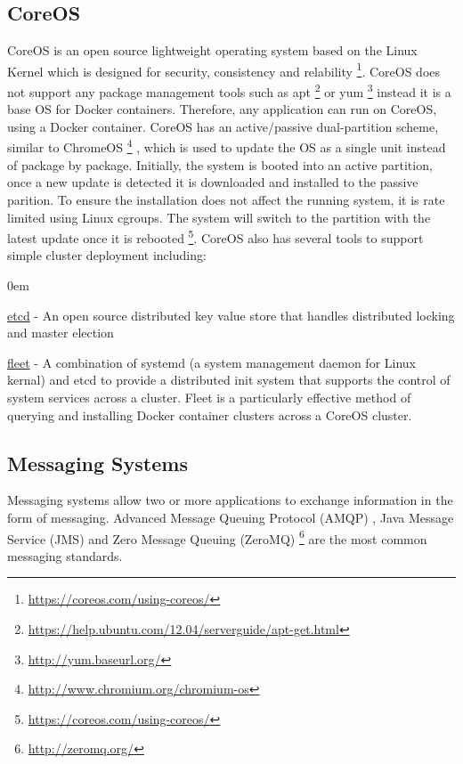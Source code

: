 \documentclass[a4paper,11pt,twoside]{article}
\begin{document}
\subsection{CoreOS} \label{CoreOS}
CoreOS is an open source lightweight operating system based on the Linux Kernel which is designed for security, consistency and relability \footnote {\label{coreos} \url {https://coreos.com/using-coreos/}}. CoreOS does not support any package management tools such as apt \footnote{\url{https://help.ubuntu.com/12.04/serverguide/apt-get.html}} or yum \footnote {\url{http://yum.baseurl.org/}} instead it is a base OS for Docker containers. Therefore, any application can run on CoreOS, using a Docker container. CoreOS has an active/passive dual-partition scheme, similar to ChromeOS \footnote{\url{http://www.chromium.org/chromium-os}} , which is used to update the OS as a single unit instead of package by package. Initially, the system is booted into an active partition, once a new update is detected it is downloaded and installed to the passive parition. To ensure the installation does not affect the running system, it is rate limited using Linux cgroups. The system will switch to the partition with the latest update once it is rebooted \footnote {\label{coreos} \url {https://coreos.com/using-coreos/}}. CoreOS also has several tools to support simple cluster deployment including:

  \begin{list}{-}{}
  \itemsep0em
  \item \underline{etcd} - An open source distributed key value store that handles distributed locking and master election
  
  \item \underline{fleet} - A combination of systemd (a system management daemon for Linux kernal) and etcd to provide a distributed init system that supports the control of system services across a cluster. Fleet is a particularly effective method of querying and installing Docker container clusters across a CoreOS cluster.
  \end{list}

\noindent



\subsection{Messaging Systems} \label{MOM}
Messaging systems allow two or more applications to exchange information in the form of messaging. Advanced Message Queuing Protocol (AMQP) \cite{AMPQ}, Java Message Service (JMS) \cite{JMS} and Zero Message Queuing (ZeroMQ) \footnote{\label{ZeroMQ} \url{http://zeromq.org/}} are the most common messaging standards. 
\end{document}
